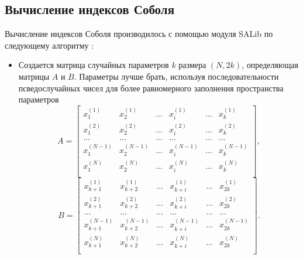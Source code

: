 \documentclass[a4paper,12pt]{article} %
\begin{document}
\subsection{Вычисление индексов Соболя}
Вычисление индексов Соболя производилось с помощью модуля SALib \cite{Iwanaga2022, Herman2017} по следующему алгоритму \cite{saltelli2008global}:
\begin{itemize}
\item Создается матрица случайных параметров $k$ размера $(N,2k)$, определяющая матрицы $A$ и $B$. Параметры лучше брать, используя последовательности псведослучайных чисел для более равномерного заполнения пространства параметров \cite{sobol1967distribution, sobol1976uniformly}
\begin{displaymath}
A=\begin{bmatrix}
x_1^{(1)} & x_2^{(1)} & \ldots & x_i^{(1)} & \ldots & x_k^{(1)} \\
x_1^{(2)} & x_2^{(2)} & \ldots & x_i^{(2)} & \ldots & x_k^{(2)} \\
\ldots & \ldots & \ldots & \ldots & \ldots & \ldots \\
x_1^{(N-1)} & x_2^{(N-1)} & \ldots & x_i^{(N-1)} & \ldots & x_k^{(N-1)} \\
x_1^{(N)} & x_2^{(N)} & \ldots & x_i^{(N)} & \ldots & x_k^{(N)} \\
\end{bmatrix},
\end{displaymath}
\begin{displaymath}
B=\begin{bmatrix}
x_{k+1}^{(1)} & x_{k+2}^{(1)} & \ldots & x_{k+i}^{(1)} & \ldots & x_{2k}^{(1)} \\
x_{k+1}^{(2)} & x_{k+2}^{(2)} & \ldots & x_{k+i}^{(2)} & \ldots & x_{2k}^{(2)} \\
\ldots & \ldots & \ldots & \ldots & \ldots & \ldots \\
x_{k+1}^{(N-1)} & x_{k+2}^{(N-1)} & \ldots & x_{k+i}^{(N-1)} & \ldots & x_{2k}^{(N-1)} \\
x_{k+1}^{(N)} & x_{k+2}^{(N)} & \ldots & x_{k+i}^{(N)} & \ldots & x_{2k}^{(N)} \\
\end{bmatrix}.
\end{displaymath}


\end{itemize}
\end{document}

